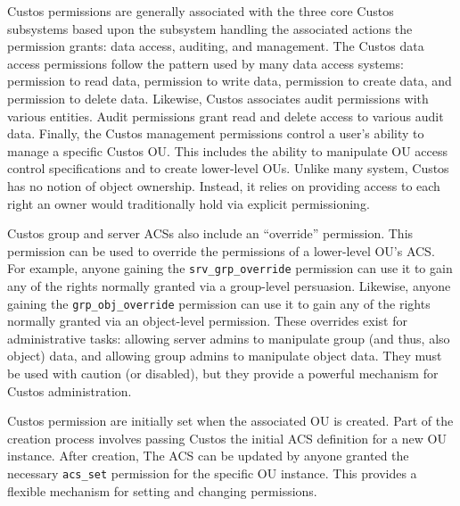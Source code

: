 Custos permissions are generally associated with the three core Custos
subsystems based upon the subsystem handling the associated actions
the permission grants: data access, auditing, and management. The
Custos data access permissions follow the pattern used by many data
access systems: permission to read data, permission to write data,
permission to create data, and permission to delete data. Likewise,
Custos associates audit permissions with various entities. Audit
permissions grant read and delete access to various audit data.
Finally, the Custos management permissions control a user's ability to
manage a specific Custos OU. This includes the ability to manipulate
OU access control specifications and to create lower-level OUs. Unlike
many system, Custos has no notion of object ownership. Instead, it
relies on providing access to each right an owner would traditionally
hold via explicit permissioning.

Custos group and server ACSs also include an ``override''
permission. This permission can be used to override the permissions of
a lower-level OU's ACS. For example, anyone gaining the
\texttt{srv\_grp\_override} permission can use it to gain any of the
rights normally granted via a group-level persuasion. Likewise, anyone
gaining the \texttt{grp\_obj\_override} permission can use it to gain
any of the rights normally granted via an object-level
permission. These overrides exist for administrative tasks: allowing
server admins to manipulate group (and thus, also object) data, and
allowing group admins to manipulate object data. They must be used
with caution (or disabled), but they provide a powerful mechanism for
Custos administration.

Custos permission are initially set when the associated OU is
created. Part of the creation process involves passing Custos the
initial ACS definition for a new OU instance. After creation, The ACS
can be updated by anyone granted the necessary \texttt{acs\_set}
permission for the specific OU instance. This provides a flexible
mechanism for setting and changing permissions.

